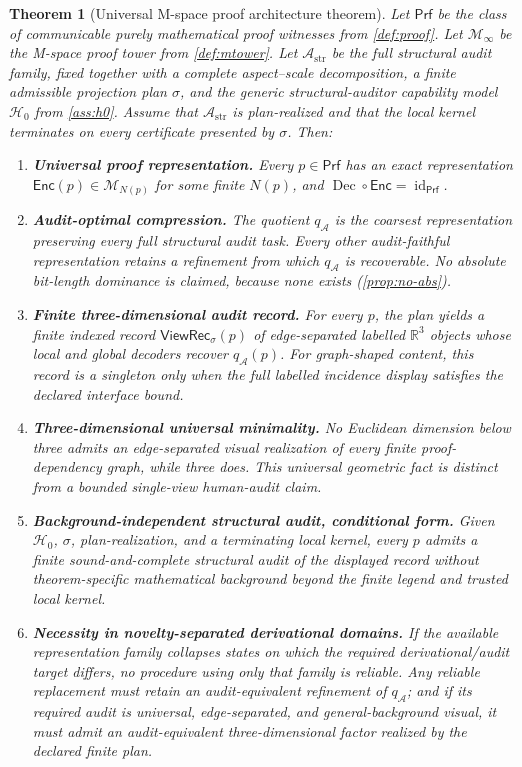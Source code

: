 \documentclass[11pt]{article}
\newcommand{\Dec}{\ensuremath{\operatorname{Dec}}}
\newcommand{\R}{\mathbb R}
\newcommand{\Prf}{\mathsf{Prf}}
\newcommand{\M}{\mathcal M}
\newcommand{\Enc}{\mathsf{Enc}}
\newcommand{\qA}{q_{\mathcal A}}
\newcommand{\mcA}{\mathcal A}
\newcommand{\mcH}{\mathcal H_0}
\newcommand{\ViewRec}{\ensuremath{\mathsf{ViewRec}}}
\theoremstyle{plain}
\newtheorem{theorem}{Theorem}[section]
\theoremstyle{definition}
\theoremstyle{remark}
\begin{document}
\begin{theorem}[Universal M-space proof architecture theorem]
\label{thm:full}
Let $\Prf$ be the class of communicable purely mathematical proof witnesses from
\cref{def:proof}.  Let $\M_\infty$ be the M-space proof tower from
\cref{def:mtower}.  Let $\mcA_{\mathrm{str}}$ be the full structural audit
family, fixed together with a complete aspect--scale decomposition, a finite
admissible projection plan $\sigma$, and the generic structural-auditor
capability model $\mcH$ from \cref{ass:h0}.  Assume that
$\mcA_{\mathrm{str}}$ is plan-realized and that the local kernel terminates on
every certificate presented by $\sigma$.  Then:
\begin{enumerate}
    \item \textbf{Universal proof representation.} Every $p\in\Prf$ has an exact representation $\Enc(p)\in\M_{N(p)}$ for some finite $N(p)$, and $\Dec\circ\Enc=\operatorname{id}_{\Prf}$.
    \item \textbf{Audit-optimal compression.} The quotient $\qA$ is the coarsest representation preserving every full structural audit task.  Every other audit-faithful representation retains a refinement from which $\qA$ is recoverable.  No absolute bit-length dominance is claimed, because none exists (\cref{prop:no-abs}).
    \item \textbf{Finite three-dimensional audit record.} For every $p$, the plan yields a finite indexed record $\ViewRec_\sigma(p)$ of edge-separated labelled $\R^3$ objects whose local and global decoders recover $\qA(p)$.  For graph-shaped content, this record is a singleton only when the full labelled incidence display satisfies the declared interface bound.
    \item \textbf{Three-dimensional universal minimality.} No Euclidean dimension below three admits an edge-separated visual realization of every finite proof-dependency graph, while three does.  This universal geometric fact is distinct from a bounded single-view human-audit claim.
    \item \textbf{Background-independent structural audit, conditional form.} Given $\mcH$, $\sigma$, plan-realization, and a terminating local kernel, every $p$ admits a finite sound-and-complete structural audit of the displayed record without theorem-specific mathematical background beyond the finite legend and trusted local kernel.
    \item \textbf{Necessity in novelty-separated derivational domains.} If the available representation family collapses states on which the required derivational/audit target differs, no procedure using only that family is reliable.  Any reliable replacement must retain an audit-equivalent refinement of $\qA$; and if its required audit is universal, edge-separated, and general-background visual, it must admit an audit-equivalent three-dimensional factor realized by the declared finite plan.

\end{enumerate}
\end{theorem}
\end{document}
